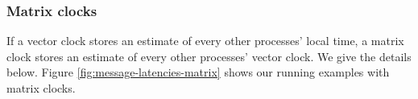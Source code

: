 \documentclass[]             %
{NASA}                       %
\theoremstyle{definition}
\begin{document}










\subsubsection{Matrix clocks}
If a vector clock stores an estimate of every other processes' local
time, a matrix clock stores an estimate of every other processes'
vector clock. We give the details below. Figure
\ref{fig:message-latencies-matrix} shows our running examples with
matrix clocks.
\end{document}
